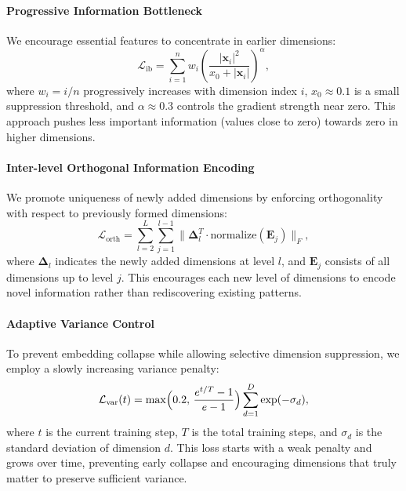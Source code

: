 \paragraph{Progressive Information Bottleneck}
We encourage essential features to concentrate in earlier dimensions:
\begin{equation}
    \mathcal{L}_{\text{ib}} = \sum_{i=1}^{n} w_i 
    \left(\frac{|\mathbf{x}_i|^2}{x_0 + |\mathbf{x}_i|}\right)^\alpha,
\end{equation}
where $w_i = i/n$ progressively increases with dimension index $i$, $x_0 \approx 0.1$ is a small suppression threshold, and $\alpha\approx 0.3$ controls the gradient strength near zero. 
This approach pushes less important information (values close to zero) towards zero in higher dimensions.

\paragraph{Inter-level Orthogonal Information Encoding}
We promote uniqueness of newly added dimensions by enforcing orthogonality with respect to previously formed dimensions:
\begin{equation}
    \mathcal{L}_{\text{orth}} = \sum_{l=2}^{L} \sum_{j=1}^{l-1} \|\mathbf{\Delta}_l^T \cdot \text{normalize}(\mathbf{E}_j)\|_F,
\end{equation}
where $\mathbf{\Delta}_l$ indicates the newly added dimensions at level $l$, and $\mathbf{E}_j$ consists of all dimensions up to level $j$. This encourages each new level of dimensions to encode novel information rather than rediscovering existing patterns.

\paragraph{Adaptive Variance Control}
To prevent embedding collapse while allowing selective dimension suppression, we employ a slowly increasing variance penalty:
\begin{equation}
    \mathcal{L}_{\text{var}}(t) 
    = 
    \max\Bigl(0.2,\, \frac{e^{t/T} - 1}{e - 1}\Bigr) 
    \sum_{d=1}^D 
    \exp(-\sigma_d),
\end{equation}
where $t$ is the current training step, $T$ is the total training steps, and $\sigma_d$ is the standard deviation of dimension $d$. This loss starts with a weak penalty and grows over time, preventing early collapse and encouraging dimensions that truly matter to preserve sufficient variance.

